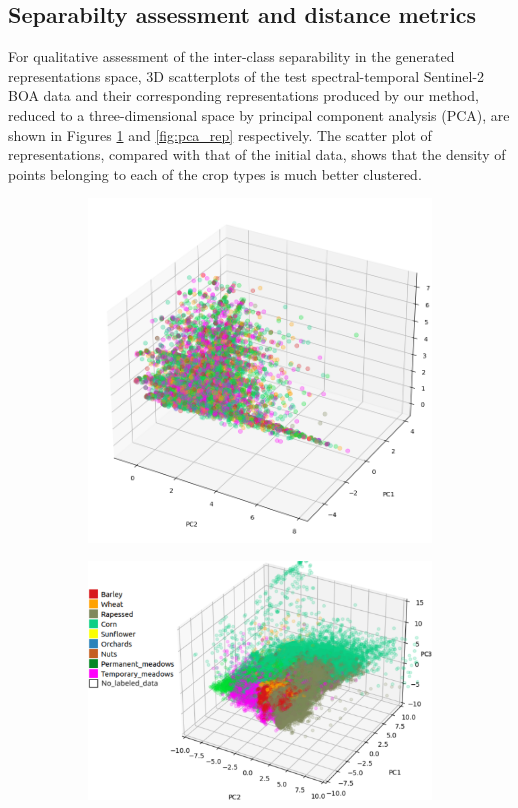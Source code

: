 \documentclass[journal,article,submit,pdftex,moreauthors]{Definitions/mdpi}
\begin{document}
\subsection{Separabilty assessment and distance metrics}
For qualitative assessment of the inter-class separability in the generated representations space, 
3D scatterplots of the test spectral-temporal Sentinel-2 \ac{BOA} data and their corresponding representations produced by our method, reduced to a three-dimensional space by principal component analysis (PCA), are shown in Figures \ref{fig:pca_raw} and \ref{fig:pca_rep} respectively.
The scatter plot of representations, compared with that of the initial data, shows that the density of points belonging to each of the crop types is much better clustered.
\begin{figure}[H]
	\centering
	\begin{subfigure}[t]{0.4\linewidth}
		\centering
		\includegraphics[width=0.9\linewidth]{figures/pcs_2.png}
		\caption{}
	  \label{fig:pca_raw}
	\end{subfigure}
	\begin{subfigure}[t]{0.5\linewidth}
		\centering
		\includegraphics[width=0.9\linewidth]{figures/PCA_3D_W_classes.pdf}

\end{subfigure}
\end{figure}
\end{document}
